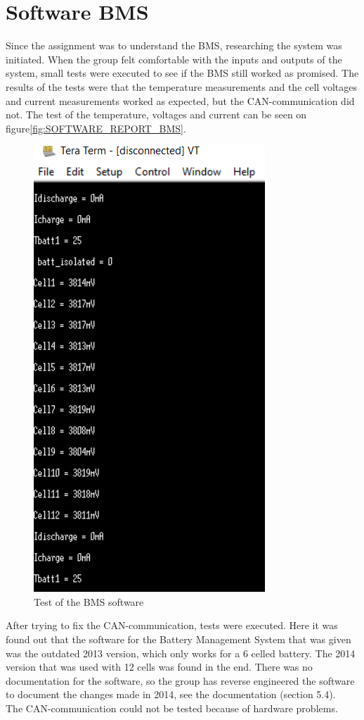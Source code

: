 \section{Software BMS}
Since the assignment was to understand the BMS, researching the system was initiated. When the group felt comfortable with the inputs and outputs of the system, small tests were executed to see if the BMS still worked as promised. The results of the tests were that the temperature measurements and the cell voltages and current measurements worked as expected, but the CAN-communication did not. The test of the temperature, voltages and current can be seen on figure\vref{fig:SOFTWARE_REPORT_BMS}.\\

\begin{figure}[H]
	\centering
	\includegraphics[width=0.45\linewidth]{SubPages/Images/BMS_teraterm_test.PNG}
	\caption{Test of the BMS software}
	\label{fig:SOFTWARE_REPORT_BMS}
\end{figure}

After trying to fix the CAN-communication, tests were executed. Here it was found out that the software for the Battery Management System that was given was the outdated 2013 version, which only works for a 6 celled battery. The 2014 version that was used with 12 cells was found in the end. There was no documentation for the software, so the group has reverse engineered the software to document the changes made in 2014, see the documentation\cite{AU2} (section 5.4).\\
The CAN-communication could not be tested because of hardware problems. 



